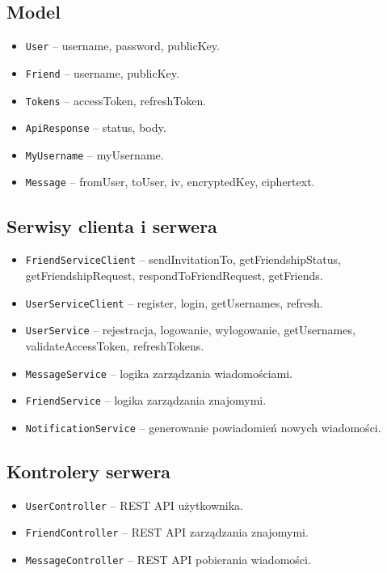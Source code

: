 \documentclass[a4paper,12pt]{article}
\begin{document}
\subsection*{Model}
\begin{itemize}
    \item \texttt{User} – username, password, publicKey.
    \item \texttt{Friend} – username, publicKey.
    \item \texttt{Tokens} – accessToken, refreshToken.
    \item \texttt{ApiResponse} – status, body.
    \item \texttt{MyUsername} – myUsername.
    \item \texttt{Message} – fromUser, toUser, iv, encryptedKey, ciphertext.
\end{itemize}

\subsection*{Serwisy clienta i serwera}
\begin{itemize}
    \item \texttt{FriendServiceClient} – sendInvitationTo, getFriendshipStatus, getFriendshipRequest, respondToFriendRequest, getFriends.
    \item \texttt{UserServiceClient} – register, login, getUsernames, refresh.
    \item \texttt{UserService} – rejestracja, logowanie, wylogowanie, getUsernames, validateAccessToken, refreshTokens.
    \item \texttt{MessageService} – logika zarządzania wiadomościami.
    \item \texttt{FriendService} – logika zarządzania znajomymi.
    \item \texttt{NotificationService} – generowanie powiadomień nowych wiadomości.
\end{itemize}

\subsection*{Kontrolery serwera}
\begin{itemize}
    \item \texttt{UserController} – REST API użytkownika.
    \item \texttt{FriendController} – REST API zarządzania znajomymi.
    \item \texttt{MessageController} – REST API pobierania wiadomości.
\end{itemize}
\end{document}
